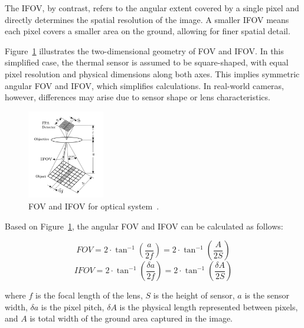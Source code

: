 The \gls{IFOV}, by contrast, refers to the angular extent covered by a single pixel and directly determines the spatial resolution of the image. A smaller \gls{IFOV} means each pixel covers a smaller area on the ground, allowing for finer spatial detail.

Figure~\ref{fig:fov_ifov} illustrates the two-dimensional geometry of \gls{FOV} and \gls{IFOV}. In this simplified case, the thermal sensor is assumed to be square-shaped, with equal pixel resolution and physical dimensions along both axes. This implies symmetric angular \gls{FOV} and \gls{IFOV}, which simplifies calculations. In real-world cameras, however, differences may arise due to sensor shape or lens characteristics.

\begin{figure}[H]
    \centering
    \includegraphics[width=0.3\textwidth]{figs/Huirui/fov_ifov_2d_diagram.png}
    \caption{\gls{FOV} and \gls{IFOV} for optical system~\cite{pencheva2006design}.}
    \label{fig:fov_ifov}
\end{figure}

Based on Figure~\ref{fig:fov_ifov}, the angular \gls{FOV} and \gls{IFOV} can be calculated as follows:

\begin{equation}
    FOV = 2 \cdot \tan^{-1} \left( \frac{a}{2f} \right) = 2 \cdot \tan^{-1} \left( \frac{A}{2S} \right)
    \label{eq:fov}
\end{equation}
\vspace{-1em}
\begin{equation}
    IFOV = 2 \cdot \tan^{-1} \left( \frac{\delta a}{2f} \right) = 2 \cdot \tan^{-1} \left( \frac{\delta A}{2S} \right)
\end{equation}

where \( f \) is the focal length of the lens, \( S \) is the height of sensor, \( a \) is the sensor width, \( \delta a \) is the pixel pitch, \( \delta A \) is the physical length represented between pixels, and \( A \) is total width of the ground area captured in the image.

